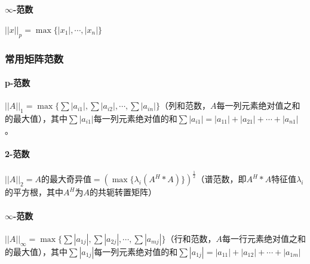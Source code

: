 \paragraph{$\infty$-范数}$||x||_p = \max\{|x_1|,\cdots,|x_n|\}$
\subsubsection{常用矩阵范数}
\paragraph{p-范数}$||A||_1=\max\{\sum|a_{i1}|,\sum|a_{i2}|,\cdots,\sum|a_{in}|\}$（列和范数，$A$每一列元素绝对值之和的最大值），其中$\sum|a_{i1}|$每一列元素绝对值的和$\sum|a_{i1}|=|a_{11}|+|a_{21}|+\cdots+|a_{n1}|$。
\paragraph{2-范数}$||A||_2=A$的最大奇异值$=(\max\{ \lambda_i(A^H*A) \})^\frac{1}{2}$（谱范数，即$A^H*A$特征值$\lambda_i$的平方根，其中$A^H$为$A$的共轭转置矩阵）
\paragraph{$\infty$-范数}$||A||_\infty=\max\{\sum|a_{1j}|,\sum|a_{2j}|,\cdots,\sum|a_{mj}|\}$（行和范数，$A$每一行元素绝对值之和的最大值），其中$\sum|a_{1j}|$每一列元素绝对值的和$\sum|a_{1j}|=|a_{11}|+|a_{12}|+\cdots+|a_{1m}|$